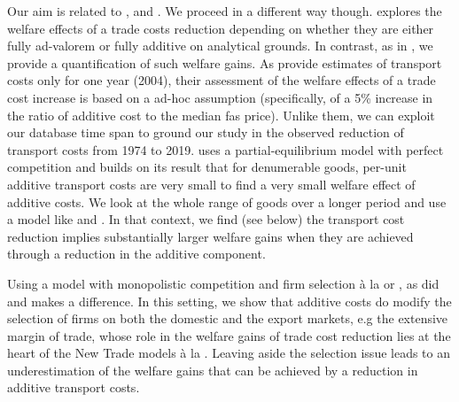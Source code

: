 \documentclass[a4paper,11pt]{article}
\newcommand\cites[1]{\citeauthor{#1}'s\ (\citeyear{#1})}
\begin{document}
Our aim is related to \cite{Irrazabal_2015}, \cite{sorensen2014} and \cite{Lashkaripour_JIE2020}. We proceed in a different way though. \cite{sorensen2014} explores the welfare effects of a trade costs reduction depending on whether they are either fully ad-valorem or fully additive on analytical grounds. In contrast, as in \cite{Irrazabal_2015}, we provide a quantification of such welfare gains. As \cite{Irrazabal_2015} provide estimates of transport costs only for one year (2004), their assessment of the welfare effects of a trade cost increase is based on a ad-hoc assumption (specifically, of a 5\% increase in the ratio of additive cost to the median fas price). Unlike them, we can exploit our database time span to ground our study in the observed reduction of transport costs from 1974 to 2019. \cite{Lashkaripour_JIE2020} uses a partial-equilibrium model with perfect competition and builds on its result that for denumerable goods, per-unit additive transport costs are very small to find a very small welfare effect of additive costs. We look at the whole range of goods over a longer period and use a \citet{melitz} model like \cite{sorensen2014} and \cite{Irrazabal_2015}. In that context,
we find (see below) the transport cost reduction implies substantially larger welfare gains when they are achieved through a reduction in the additive component.

Using a model with monopolistic competition and firm selection \`{a} la \cite{melitz} or \cite{chaney2008}, as did \cite{sorensen2014} and \cite{Irrazabal_2015} makes a difference. In this setting, we show that additive costs do modify the selection of firms on both the domestic and the export markets, e.g the extensive margin of trade, whose role in the welfare gains of trade cost reduction lies at the heart of the New Trade models  \`{a} la \cite{melitz}. Leaving aside the selection issue leads to an underestimation of the welfare gains that can be achieved by a reduction in additive transport costs.
\end{document}
